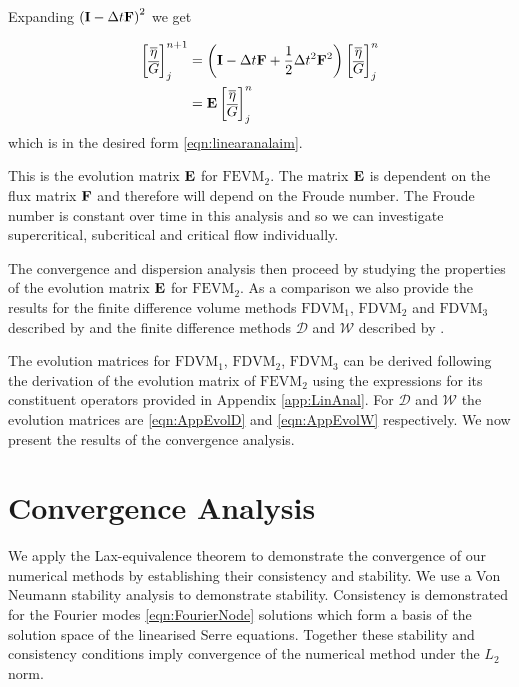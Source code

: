 Expanding $\left(\mathbf{I} - \Delta t\mathbf{F} \right)^2$ we get

\begin{align}
\begin{bmatrix}
\overline{\eta} \\ \overline{G}
\end{bmatrix}^{n+1}_j &= \left(\mathbf{I}  -\Delta t\mathbf{F} + \frac{1}{2}\Delta t^2\mathbf{F}^2 \right) \begin{bmatrix}
\overline{\eta} \\ \overline{G}
\end{bmatrix}^{n}_j \nonumber\\ &=  \mathbf{E}\begin{bmatrix}
\overline{\eta} \\ \overline{G}
\end{bmatrix}^{n}_j
\label{eqn:evolutionmatrix}
\end{align}
which is in the desired form \eqref{eqn:linearanalaim}.

This is the evolution matrix $\mathbf{E}$ for $\text{FEVM}_2$. The matrix $\mathbf{E}$ is dependent on the flux matrix $\mathbf{F}$ and therefore will depend on the Froude number. The Froude number is constant over time in this analysis and so we can investigate supercritical, subcritical and critical flow individually.

The convergence and dispersion analysis then proceed by studying the properties of the evolution matrix $\mathbf{E}$ for $\text{FEVM}_2$. As a comparison we also provide the results for the finite difference volume methods $\text{FDVM}_1$, $\text{FDVM}_2$ and $\text{FDVM}_3$ described by \citet{Zoppou-etal-2017} and the finite difference methods $\mathcal{D}$ and $\mathcal{W}$ described by \cite{Pitt-2018-61}.

The evolution matrices for $\text{FDVM}_1$, $\text{FDVM}_2$, $\text{FDVM}_3$ can be derived following the derivation of the evolution matrix of $\text{FEVM}_2$ using the expressions for its constituent operators provided in Appendix \ref{app:LinAnal}. For $\mathcal{D}$ and $\mathcal{W}$ the evolution matrices are \eqref{eqn:AppEvolD} and \eqref{eqn:AppEvolW} respectively. We now present the results of the convergence analysis.

\section{Convergence Analysis}
We apply the Lax-equivalence theorem to demonstrate the convergence of our numerical methods by establishing their consistency and stability. We use a Von Neumann stability analysis to demonstrate stability. Consistency is demonstrated for the Fourier modes \eqref{eqn:FourierNode} solutions which form a basis of the solution space of the linearised Serre equations. Together these stability and consistency conditions imply convergence of the numerical method under the $L_2$ norm. 

